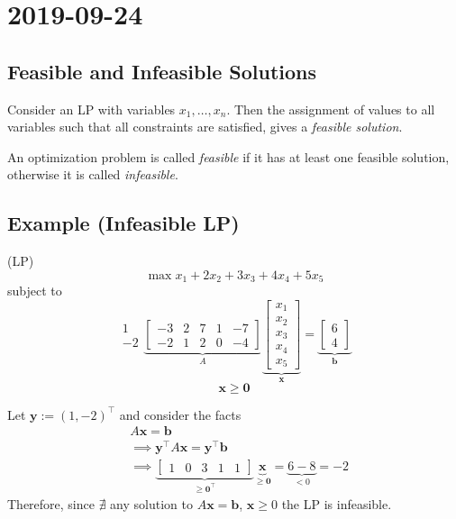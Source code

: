 \section{2019-09-24}
\begin{defbox}
    \subsection{Feasible and Infeasible Solutions}
    Consider an LP with variables $x_1,\dots,x_n$.  Then the
    assignment of values to all variables such that all constraints are satisfied,
    gives a \emph{feasible solution}.

    An optimization problem is called \emph{feasible} if it has at least one feasible
    solution, otherwise it is called \emph{infeasible}.
\end{defbox}

\subsection{Example (Infeasible LP)}
(LP)
\[\max x_1+2x_2+3x_3+4x_4+5x_5\]
subject to
\[
    \begin{matrix}
    1\\
    -2
    \end{matrix}
    \underbrace{
        \begin{bmatrix}
        -3 & 2 & 7 & 1 & -7 \\
        -2 & 1 & 2 & 0 & -4
        \end{bmatrix}}_{A}
    \underbrace{\begin{bmatrix}
        x_1\\
        x_2\\
        x_3\\
        x_4\\
        x_5
    \end{bmatrix}}_{\bm{x}}
    =
    \underbrace{\begin{bmatrix}
        6\\
        4
    \end{bmatrix}}_{\bm{b}}
\]
\[ \bm{x}\ge \bm{0} \]

Let $\bm{y}:=(1,-2)^\top$
and consider the facts
\begin{align*}
    &A\bm{x}=\bm{b}\\
    &\implies \bm{y}^\top A\bm{x}=\bm{y}^\top \bm{b}\\
    &\implies \underbrace{\begin{bmatrix}
        1 & 0 & 3 & 1 & 1
    \end{bmatrix}}_{\ge \bm{0}^\top }
    \underbrace{\bm{x}}_{\ge \bm{0}}=\underbrace{6-8}_{< 0}=-2
\end{align*}
Therefore, since $\nexists$ any solution to $A\bm{x}=\bm{b}$, $\bm{x}\ge 0$
the LP is infeasible.


